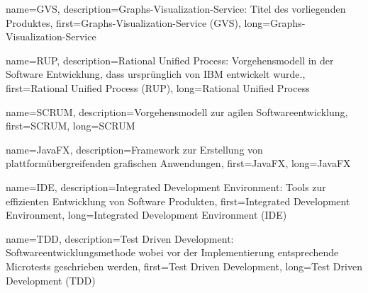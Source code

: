 



{
	name={GVS},
	description={Graphs-Visualization-Service: Titel des vorliegenden Produktes},
	first={Graphs-Visualization-Service (GVS)},
	long={Graphs-Visualization-Service}
}

{
	name={RUP},
	description={Rational Unified Process: Vorgehensmodell in der Software Entwicklung, dass ursprünglich von IBM entwickelt wurde.},
	first={Rational Unified Process (RUP)},
	long={Rational Unified Process}
}

{
	name={SCRUM},
	description={Vorgehensmodell zur agilen Softwareentwicklung},
	first={SCRUM},
	long={SCRUM}
}

{
	name={JavaFX},
	description={Framework zur Erstellung von plattformübergreifenden grafischen Anwendungen},
	first={JavaFX},
	long={JavaFX}
}

{
	name={IDE},
	description={Integrated Development Environment: Tools zur effizienten Entwicklung von Software Produkten},
	first={Integrated Development Environment},
	long={Integrated Development Environment (IDE)}
}

{
	name={TDD},
	description={Test Driven Development: Softwareentwicklungsmethode wobei vor der Implementierung entsprechende Microtests geschrieben werden},
	first={Test Driven Development},
	long={Test Driven Development (TDD)}
}

